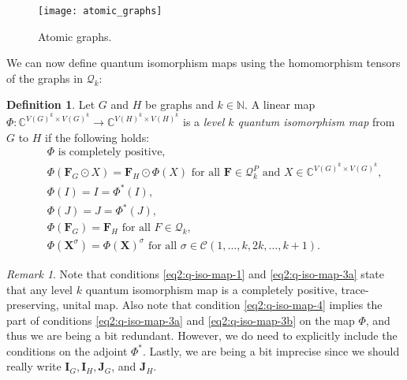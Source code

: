 \documentclass[11pt,a4paper]{article}
\theoremstyle{plain}
\theoremstyle{remark}
\newtheorem{note}{Remark}[thm]
\theoremstyle{definition}
\newtheorem{definition}[thm]{Definition}
\newcommand{\cyclicpermutations}{\mathscr{C}(1,\dots, k, 2k, \dots, k+1)}
\begin{document}
\begin{figure}[b]
  \centering
  \texttt{[image: atomic\_graphs]}
  \label{fig:atomic_graphs}
  \caption{Atomic graphs.}
\end{figure}

We can now define quantum isomorphism maps using the homomorphism tensors of the graphs in $\mathcal{Q}_k$:

\begin{definition}\label{def:kqisomap}
    Let $G$ and $H$ be graphs and $k \in \mathbb{N}$. A linear map $\Phi: \mathbb{C}^{V(G)^k \times V(G)^k} \to \mathbb{C}^{V(H)^k \times V(H)^k}$ is a \emph{level $k$ quantum isomorphism map} from $G$ to $H$ if the following holds:
    \begin{align}
        &\quad\Phi \text{ is completely positive,} \label{eq2:q-iso-map-1} \\ 
        &\quad\Phi(\boldsymbol{F}_G \odot X) = \boldsymbol{F}_H \odot \Phi(X) \text{ for all } \boldsymbol{F} \in \mathcal{Q}_k^P \text{ and }X \in \mathbb{C}^{V(G)^k \times V(G)^k},\label{eq2:q-iso-map-2} \\ 
        &\quad\Phi(I) = I = \Phi^*(I), \label{eq2:q-iso-map-3a} \\ 
        &\quad\Phi(J) = J = \Phi^*(J), \label{eq2:q-iso-map-3b} \\ 
        &\quad \Phi(\boldsymbol{F}_G) = \boldsymbol{F}_H \text{ for all } F \in \mathcal{Q}_k,\label{eq2:q-iso-map-4} \\
        &\quad\Phi(\boldsymbol{X}^{\sigma}) = \Phi(\boldsymbol{X})^{\sigma}\text{ for all }\sigma \in \cyclicpermutations. \label{eq2:q-iso-map-5}
    \end{align}
\end{definition}


    
\begin{note}\label{rem:cptpunital}
Note that conditions \eqref{eq2:q-iso-map-1} and \eqref{eq2:q-iso-map-3a} state that any level $k$ quantum isomorphism map is a completely positive, trace-preserving, unital map. Also note that condition \eqref{eq2:q-iso-map-4} implies the part of conditions \eqref{eq2:q-iso-map-3a} and \eqref{eq2:q-iso-map-3b} on the map $\Phi$, and thus we are being a bit redundant. However, we do need to explicitly include the conditions on the adjoint $\Phi^*$. Lastly, we are being a bit imprecise since we should really write $\boldsymbol{I}_G, \boldsymbol{I}_H, \boldsymbol{J}_G$, and $\boldsymbol{J}_H$. \end{note}
\end{document}
